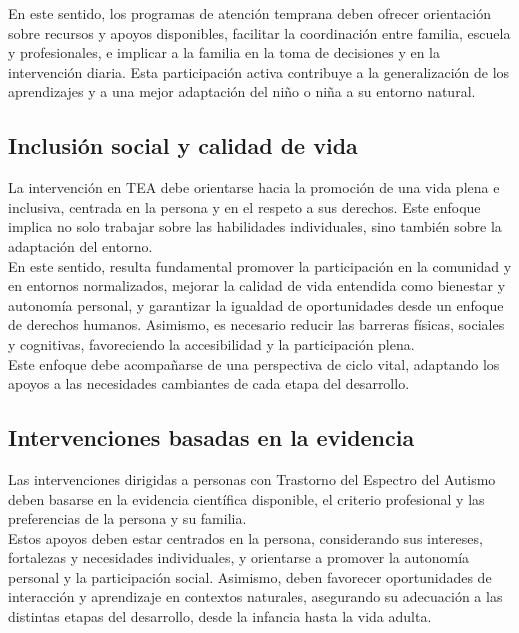 \documentclass{article}
\begin{document}
En este sentido, los programas de atención temprana deben ofrecer orientación sobre recursos y apoyos disponibles, facilitar la coordinación entre familia, escuela y profesionales, e implicar a la familia en la toma de decisiones y en la intervención diaria. Esta participación activa contribuye a la generalización de los aprendizajes y a una mejor adaptación del niño o niña a su entorno natural.

\subsection{\textbf{Inclusión social y calidad de vida}}
La intervención en TEA debe orientarse hacia la promoción de una vida plena e inclusiva, centrada en la persona y en el respeto a sus derechos. Este enfoque implica no solo trabajar sobre las habilidades individuales, sino también sobre la adaptación del entorno.\\

En este sentido, resulta fundamental promover la participación en la comunidad y en entornos normalizados, mejorar la calidad de vida entendida como bienestar y autonomía personal, y garantizar la igualdad de oportunidades desde un enfoque de derechos humanos. Asimismo, es necesario reducir las barreras físicas, sociales y cognitivas, favoreciendo la accesibilidad y la participación plena.\\

Este enfoque debe acompañarse de una perspectiva de ciclo vital, adaptando los apoyos a las necesidades cambiantes de cada etapa del desarrollo.

\subsection{\textbf{Intervenciones basadas en la evidencia}}
Las intervenciones dirigidas a personas con Trastorno del Espectro del Autismo deben basarse en la evidencia científica disponible, el criterio profesional y las preferencias de la persona y su familia.\\

Estos apoyos deben estar centrados en la persona, considerando sus intereses, fortalezas y necesidades individuales, y orientarse a promover la autonomía personal y la participación social. Asimismo, deben favorecer oportunidades de interacción y aprendizaje en contextos naturales, asegurando su adecuación a las distintas etapas del desarrollo, desde la infancia hasta la vida adulta.
\end{document}

